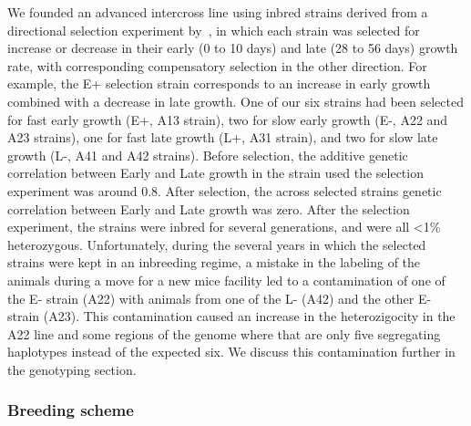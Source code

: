 \begin{refsection}
We founded an advanced intercross line using inbred strains derived from a
directional selection experiment by~\textcite{Atchley1997-vn}, in which each
strain was selected for increase or decrease in their early (0 to 10 days) and
late (28 to 56 days) growth rate, with corresponding compensatory selection in
the other direction. For example, the E+ selection strain corresponds to an
increase in early growth combined with a decrease in late growth. One of our
six strains had been selected for fast early growth (E+, A13 strain), two for
slow early growth (E-, A22 and A23 strains), one for fast late growth (L+, A31
strain), and two for slow late growth (L-, A41 and A42 strains). Before
selection, the additive genetic correlation between Early and Late growth in
the strain used the selection experiment was around 0.8. After selection, the
across selected strains genetic correlation between Early and Late growth was zero.
After the selection experiment, the strains were inbred for several
generations, and were all <1\% heterozygous. Unfortunately, during the several
years in which the selected strains were kept in an inbreeding regime, a
mistake in the labeling of the animals during a move for a new mice facility
led to a contamination of one of the E- strain (A22) with animals from one of
the L- (A42) and the other E- strain (A23). This contamination caused an
increase in the heterozigocity in the A22 line and some regions of the genome
where that are only five segregating haplotypes instead of the expected six.
We discuss this contamination further in the genotyping section.

\subsubsection{Breeding scheme}


\end{refsection}
